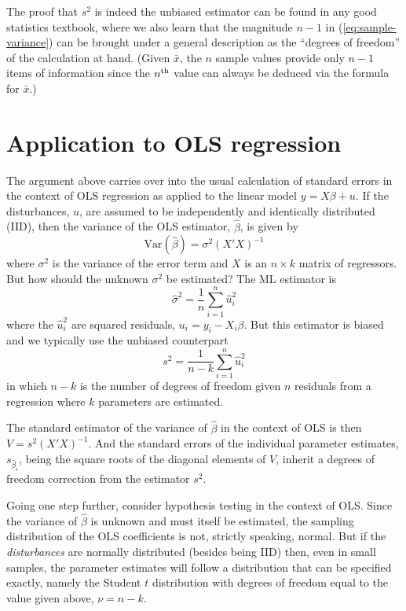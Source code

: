 The proof that $s^2$ is indeed the unbiased estimator can be found in
any good statistics textbook, where we also learn that the magnitude
$n-1$ in (\ref{eq:sample-variance}) can be brought under a general
description as the ``degrees of freedom'' of the calculation at
hand. (Given $\bar{x}$, the $n$ sample values provide only $n-1$ items
of information since the $n^{\rm th}$ value can always be deduced via the
formula for $\bar{x}$.)

\section{Application to OLS regression}
\label{sec:df-ols}

The argument above carries over into the usual calculation of standard
errors in the context of OLS regression as applied to the linear model
$y = X\beta + u$.  If the disturbances, $u$, are assumed to be
independently and identically distributed (IID), then the variance of
the OLS estimator, $\hat\beta$, is given by
%
\[
\mbox{Var}\left(\hat\beta\right) = \sigma^2 (X'X)^{-1}
\]
%
where $\sigma^2$ is the variance of the error term and $X$ is an
$n\times k$ matrix of regressors.  But how should the unknown
$\sigma^2$ be estimated?  The ML estimator is
%
\begin{equation}
\label{eq:ols-sigma2}
\hat\sigma^2 = \frac{1}{n} \sum_{i=1}^n \hat{u}^2_i
\end{equation}
%
where the $\hat{u}^2_i$ are squared residuals, $u_i = y_i - X_i\beta$.
But this estimator is biased and we typically use the unbiased
counterpart
%
\begin{equation}
\label{eq:ols-s2}
s^2 = \frac{1}{n-k} \sum_{i=1}^n \hat{u}_i^2
\end{equation}
%
in which $n - k$ is the number of degrees of freedom given $n$
residuals from a regression where $k$ parameters are estimated.

The standard estimator of the variance of $\hat\beta$ in the context
of OLS is then $V = s^2 (X'X)^{-1}$.  And the standard errors of the
individual parameter estimates, $s_{\hat{\beta}_i}$, being the square
roots of the diagonal elements of $V$, inherit a degrees of freedom
correction from the estimator $s^2$.

Going one step further, consider hypothesis testing in the context of
OLS.  Since the variance of $\hat\beta$ is unknown and must itself be
estimated, the sampling distribution of the OLS coefficients is not,
strictly speaking, normal.  But if the \textit{disturbances} are
normally distributed (besides being IID) then, even in small samples,
the parameter estimates will follow a distribution that can be
specified exactly, namely the Student $t$ distribution with degrees
of freedom equal to the value given above, $\nu = n-k$.

